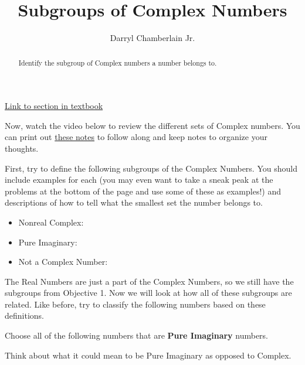 \documentclass{ximera}
\author{Darryl Chamberlain Jr.}
\title{Subgroups of Complex Numbers}
\begin{document}
\begin{abstract}
Identify the subgroup of Complex numbers a number belongs to.
\end{abstract}
\maketitle

\href{https://cnx.org/contents/mwjClAV_@8.1:Sqk1HAGf@9/Complex-Numbers}{Link to section in textbook}


Now, watch the video below to review the different sets of Complex numbers. You can print out \href{http://people.clas.ufl.edu/dchamberlain31/files/Objective-2-Subgroups-of-Complex-Numbers.pdf}{these notes} to follow along and keep notes to organize your thoughts.


First, try to define the following subgroups of the Complex Numbers. You should include examples for each (you may even want to take a sneak peak at the problems at the bottom of the page and use some of these as examples!) and descriptions of how to tell what the smallest set the number belongs to.

\begin{itemize}
\item Nonreal Complex:
\item Pure Imaginary:
\item Not a Complex Number:
\end{itemize}

The Real Numbers are just a part of the Complex Numbers, so we still have the subgroups from Objective 1. Now we will look at how all of these subgroups are related. Like before, try to classify the following numbers based on these definitions.

\begin{exercise}
Choose all of the following numbers that are \textbf{Pure Imaginary} numbers.

\begin{selectAll}
\end{selectAll}

\begin{hint}
Think about what it could mean to be Pure Imaginary as opposed to Complex.
\end{hint}

\end{exercise}
\end{document}
